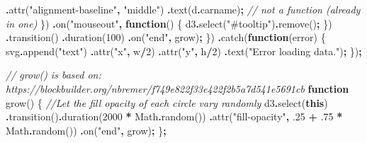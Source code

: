 \documentclass[
  openany]{book}
\newenvironment{Shaded}{\begin{snugshade}}{\end{snugshade}}
\newcommand{\AttributeTok}[1]{\textcolor[rgb]{0.77,0.63,0.00}{#1}}
\newcommand{\BuiltInTok}[1]{#1}
\newcommand{\CommentTok}[1]{\textcolor[rgb]{0.56,0.35,0.01}{\textit{#1}}}
\newcommand{\DecValTok}[1]{\textcolor[rgb]{0.00,0.00,0.81}{#1}}
\newcommand{\FloatTok}[1]{\textcolor[rgb]{0.00,0.00,0.81}{#1}}
\newcommand{\FunctionTok}[1]{\textcolor[rgb]{0.00,0.00,0.00}{#1}}
\newcommand{\KeywordTok}[1]{\textcolor[rgb]{0.13,0.29,0.53}{\textbf{#1}}}
\newcommand{\NormalTok}[1]{#1}
\newcommand{\OperatorTok}[1]{\textcolor[rgb]{0.81,0.36,0.00}{\textbf{#1}}}
\newcommand{\StringTok}[1]{\textcolor[rgb]{0.31,0.60,0.02}{#1}}
\begin{document}
\begin{Shaded}
\begin{Highlighting}[]
          \OperatorTok{.}\FunctionTok{attr}\NormalTok{(}\StringTok{"alignment{-}baseline"}\OperatorTok{,} \StringTok{"middle"}\NormalTok{)}
          \OperatorTok{.}\FunctionTok{text}\NormalTok{(d}\OperatorTok{.}\AttributeTok{carname}\NormalTok{)}\OperatorTok{;} \CommentTok{// not a function (already in one)}
\NormalTok{      \})}
      \OperatorTok{.}\FunctionTok{on}\NormalTok{(}\StringTok{"mouseout"}\OperatorTok{,} \KeywordTok{function}\NormalTok{() \{}
\NormalTok{        d3}\OperatorTok{.}\FunctionTok{select}\NormalTok{(}\StringTok{"\#tooltip"}\NormalTok{)}\OperatorTok{.}\FunctionTok{remove}\NormalTok{()}\OperatorTok{;}
\NormalTok{      \})}
      \OperatorTok{.}\FunctionTok{transition}\NormalTok{()}
      \OperatorTok{.}\FunctionTok{duration}\NormalTok{(}\DecValTok{100}\NormalTok{)}
      \OperatorTok{.}\FunctionTok{on}\NormalTok{(}\StringTok{"end"}\OperatorTok{,}\NormalTok{ grow)}\OperatorTok{;}
\NormalTok{  \})}
  \OperatorTok{.}\FunctionTok{catch}\NormalTok{(}\KeywordTok{function}\NormalTok{(error) \{}
\NormalTok{    svg}\OperatorTok{.}\FunctionTok{append}\NormalTok{(}\StringTok{"text"}\NormalTok{)}
      \OperatorTok{.}\FunctionTok{attr}\NormalTok{(}\StringTok{"x"}\OperatorTok{,}\NormalTok{ w}\OperatorTok{/}\DecValTok{2}\NormalTok{)}
      \OperatorTok{.}\FunctionTok{attr}\NormalTok{(}\StringTok{"y"}\OperatorTok{,}\NormalTok{ h}\OperatorTok{/}\DecValTok{2}\NormalTok{)}
      \OperatorTok{.}\FunctionTok{text}\NormalTok{(}\StringTok{"Error loading data."}\NormalTok{)}\OperatorTok{;}
\NormalTok{  \})}\OperatorTok{;}

\CommentTok{// grow() is based on: https://blockbuilder.org/nbremer/f749e822f33e422f2b5a7d541e5691cb}
\KeywordTok{function} \FunctionTok{grow}\NormalTok{() \{}
  \CommentTok{//Let the fill opacity of each circle vary randomly}
\NormalTok{  d3}\OperatorTok{.}\FunctionTok{select}\NormalTok{(}\KeywordTok{this}\NormalTok{)}
    \OperatorTok{.}\FunctionTok{transition}\NormalTok{()}\OperatorTok{.}\FunctionTok{duration}\NormalTok{(}\DecValTok{2000} \OperatorTok{*} \BuiltInTok{Math}\OperatorTok{.}\FunctionTok{random}\NormalTok{())}
    \OperatorTok{.}\FunctionTok{attr}\NormalTok{(}\StringTok{"fill{-}opacity"}\OperatorTok{,} \FloatTok{.25} \OperatorTok{+} \FloatTok{.75} \OperatorTok{*} \BuiltInTok{Math}\OperatorTok{.}\FunctionTok{random}\NormalTok{())}
    \OperatorTok{.}\FunctionTok{on}\NormalTok{(}\StringTok{"end"}\OperatorTok{,}\NormalTok{ grow)}\OperatorTok{;}
\NormalTok{\}}\OperatorTok{;}
\end{Highlighting}
\end{Shaded}
\end{document}
